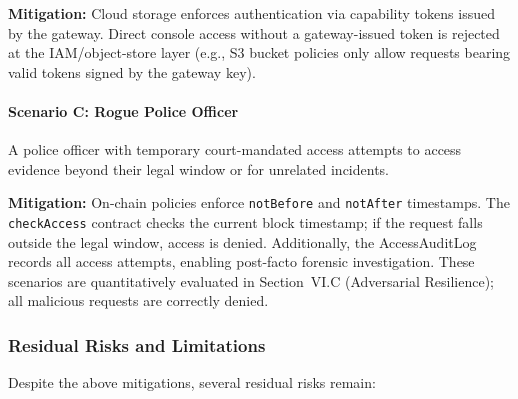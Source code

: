 \documentclass[pdflatex,sn-mathphys-num]{sn-jnl}
\begin{document}
\textbf{Mitigation:} Cloud storage enforces authentication via capability tokens issued by the gateway. Direct console access without a gateway-issued token is rejected at the IAM/object-store layer (e.g., S3 bucket policies only allow requests bearing valid tokens signed by the gateway key).

\paragraph{Scenario C: Rogue Police Officer}
A police officer with temporary court-mandated access attempts to access evidence beyond their legal window or for unrelated incidents.

\textbf{Mitigation:} On-chain policies enforce \texttt{notBefore} and \texttt{notAfter} timestamps. The \texttt{checkAccess} contract checks the current block timestamp; if the request falls outside the legal window, access is denied. Additionally, the AccessAuditLog records all access attempts, enabling post-facto forensic investigation.
These scenarios are quantitatively evaluated in Section~VI.C (Adversarial Resilience); all malicious requests are correctly denied.

\subsubsection{Residual Risks and Limitations}

Despite the above mitigations, several residual risks remain:
\end{document}
